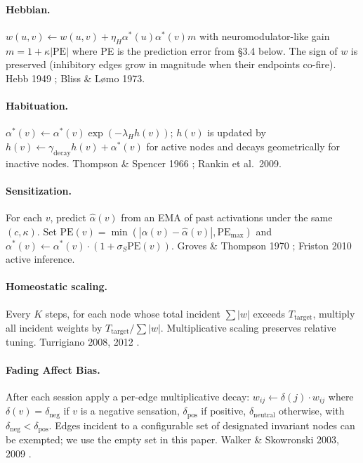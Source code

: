 \documentclass{article}
\begin{document}
\paragraph{Hebbian.} $w(u, v) \leftarrow w(u, v) + \eta_H \alpha^*(u)
\alpha^*(v) m$ with neuromodulator-like gain
$m = 1 + \kappa |\mathrm{PE}|$ where PE is the prediction error from
\S 3.4 below. The sign of $w$ is preserved (inhibitory edges grow in
magnitude when their endpoints co-fire). Hebb 1949
\cite{hebb1949organization}; Bliss \& L\o mo 1973.

\paragraph{Habituation.} $\alpha^*(v) \leftarrow \alpha^*(v)
\exp(-\lambda_H h(v))$; $h(v)$ is updated by
$h(v) \leftarrow \gamma_{\text{decay}} h(v) + \alpha^*(v)$ for active
nodes and decays geometrically for inactive nodes. Thompson \& Spencer 1966
\cite{thompson1966habituation}; Rankin et al.\ 2009.

\paragraph{Sensitization.} For each $v$, predict
$\hat{\alpha}(v)$ from an EMA of past activations under the same
$(c, \kappa)$. Set $\mathrm{PE}(v) = \min(|\alpha(v) - \hat{\alpha}(v)|,
\mathrm{PE}_{\max})$ and
$\alpha^*(v) \leftarrow \alpha^*(v) \cdot (1 + \sigma_S \mathrm{PE}(v))$.
Groves \& Thompson 1970 \cite{groves1970habituation}; Friston 2010 active
inference.

\paragraph{Homeostatic scaling.} Every $K$ steps, for each node whose total
incident $\sum |w|$ exceeds $T_{\text{target}}$, multiply all incident
weights by $T_{\text{target}} / \sum |w|$. Multiplicative scaling preserves
relative tuning. Turrigiano 2008, 2012 \cite{turrigiano2008homeostatic}.

\paragraph{Fading Affect Bias.} After each session apply a per-edge
multiplicative decay:
$w_{ij} \leftarrow \delta(j) \cdot w_{ij}$ where
$\delta(v) = \delta_{\text{neg}}$ if $v$ is a negative sensation,
$\delta_{\text{pos}}$ if positive, $\delta_{\text{neutral}}$ otherwise, with
$\delta_{\text{neg}} < \delta_{\text{pos}}$. Edges incident to a
configurable set of designated invariant nodes can be exempted; we use the
empty set in this paper. Walker \& Skowronski 2003, 2009
\cite{walker2009fab}.
\end{document}
